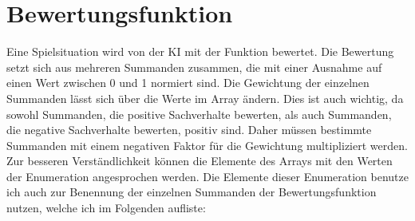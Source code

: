 \section{Bewertungsfunktion} \label{sec:ai:rating_function}
Eine Spielsituation wird von der KI mit der Funktion  bewertet. Die Bewertung setzt sich aus mehreren Summanden zusammen, die mit einer Ausnahme auf einen Wert zwischen 0 und 1 normiert sind. Die Gewichtung der einzelnen Summanden lässt sich über die Werte im Array  ändern. Dies ist auch wichtig, da sowohl Summanden, die positive Sachverhalte bewerten, als auch Summanden, die negative Sachverhalte bewerten, positiv sind. Daher müssen bestimmte Summanden mit einem negativen Faktor für die Gewichtung multipliziert werden. Zur besseren Verständlichkeit können die Elemente des Arrays  mit den Werten der Enumeration  angesprochen werden. Die Elemente dieser Enumeration benutze ich auch zur Benennung der einzelnen Summanden der Bewertungsfunktion nutzen, welche ich im Folgenden aufliste:
